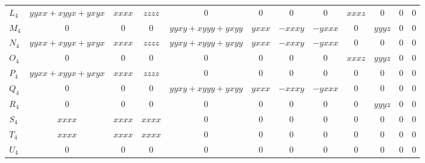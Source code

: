 \documentclass[a4paper,11pt]{article}
\begin{document}
\begin{landscape}
{\begin{tabular}{@{}l c c c c c c c c c c c@{}}
$L_4$ & \footnotesize$yyxx{+}xyyx{+}yxyx$ & $xxxx$ & $zzzz$ & $0$ & $0$ & $0$ & $0$ & $xxxz$ & $0$ & $0$ & $0$ \\
$M_4$ & $0$ & $0$ & $0$ & \footnotesize$yyxy{+}xyyy{+}yxyy$ & $yxxx$ & $-xxxy$ & $-yxxx$ & $0$ & $yyyz$ & $0$ & $0$ \\
$N_4$ & \footnotesize$yyxx{+}xyyx{+}yxyx$ & $xxxx$ & $zzzz$ & \footnotesize$yyxy{+}xyyy{+}yxyy$ & $yxxx$ & $-xxxy$ & $-yxxx$ & $0$ & $0$ & $0$ & $0$ \\
$O_4$ & $0$ & $0$ & $0$ & $0$ & $0$ & $0$ & $0$ & $xxxz$ & $yyyz$ & $0$ & $0$ \\
$P_4$ & \footnotesize$yyxx{+}xyyx{+}yxyx$ & $xxxx$ & $zzzz$ & $0$ & $0$ & $0$ & $0$ & $0$ & $0$ & $0$ & $0$ \\
$Q_4$ & $0$ & $0$ & $0$ & \footnotesize$yyxy{+}xyyy{+}yxyy$ & $yxxx$ & $-xxxy$ & $-yxxx$ & $0$ & $0$ & $0$ & $0$ \\
$R_4$ & $0$ & $0$ & $0$ & $0$ & $0$ & $0$ & $0$ & $0$ & $yyyz$ & $0$ & $0$ \\
$S_4$ & $xxxx$ & $xxxx$ & $xxxx$ & $0$ & $0$ & $0$ & $0$ & $0$ & $0$ & $0$ & $0$ \\
$T_4$ & $xxxx$ & $xxxx$ & $xxxx$ & $0$ & $0$ & $0$ & $0$ & $0$ & $0$ & $0$ & $0$ \\
$U_4$ & $0$ & $0$ & $0$ & $0$ & $0$ & $0$ & $0$ & $0$ & $0$ & $0$ & $0$ \\
\bottomrule
\end{tabular}
}
\end{landscape}
\end{document}
